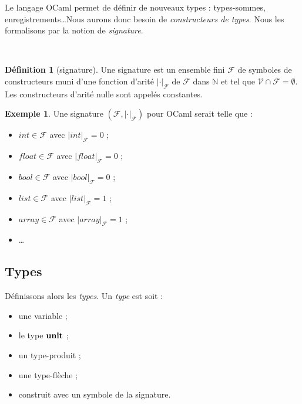 \documentclass[a4paper]{report}
\theoremstyle{definition}
\newtheorem{definition}[theoreme]{Définition}
\newtheorem{exemple}[theoreme]{Exemple}
\newcommand{\unit}{\bold{unit}}
\newcommand{\V}{\mathscr{V}}
\newcommand{\F}{\mathscr{F}}
\newcommand\laure[1]{{\bf\color{WildStrawberry}{TODO: #1}}\\}
\begin{document}
Le langage OCaml permet de définir de nouveaux types : types-sommes, enregistrements\ldots Nous aurons donc besoin de \emph{constructeurs de types}. Nous les formalisons par la notion de \emph{signature}.

\laure{Il me semblait qu'on était d'accord pour ne pas passer par cette définition}
\begin{definition}[signature]
  Une signature est un ensemble fini $\F$ de symboles de constructeurs muni d'une fonction d'arité $| \cdot |_\F$ de $\F$ dans $\mathbb{N}$ et tel que $\V \cap \F = \emptyset$. Les constructeurs d'arité nulle sont appelés constantes.
\end{definition}

\begin{exemple}
  Une signature $( \F, | \cdot |_\F )$ pour OCaml serait telle que :
  \begin{itemize}
    \item $int \in \F$ avec $| int |_\F = 0$ ;
    \item $float \in \F$ avec $| float |_\F = 0$ ;
    \item $bool \in \F$ avec $| bool |_\F = 0$ ;
    \item $list \in \F$ avec $| list |_\F = 1$ ;
    \item $array \in \F$ avec $| array |_\F = 1$ ;
    \item \dots
  \end{itemize}
\end{exemple}



\subsection{Types}

Définissons alors les \emph{types}. Un \emph{type} est soit :
\begin{itemize}[nosep]
  \item une variable ; \laure{qui moralement est ...}
  \item le type $\unit$ ;
  \item un type-produit ;
  \item une type-flèche ;
  \item construit avec un symbole de la signature.
\end{itemize}
\end{document}
